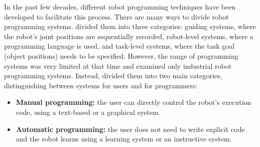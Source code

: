In the past few decades, different robot programming techniques have been developed to facilitate this process. 
There are many ways to divide robot programming systems. 
\cite{lozano1983robot} divided them into three categories: 
guiding systems, where the robot's joint positions are sequentially recorded,
robot-level systems, where a programming language is used, and
task-level systems, where the task goal (\eg object positions) needs to be specified.
However, the range of programming systems was very limited at that time and examined only industrial robot programming systems.
Instead, \cite{Biggs2003} divided them into two main categories, distinguishing between systems for users and for programmers:

\begin{itemize}
 \item {\textbf{Manual programming:} the user can directly control the robot's execution code, using a text-based or a graphical system.}
 \item {\textbf{Automatic programming:} the user does not need to write explicit code and the robot learns using a learning system or an instructive system.}
\end{itemize}


